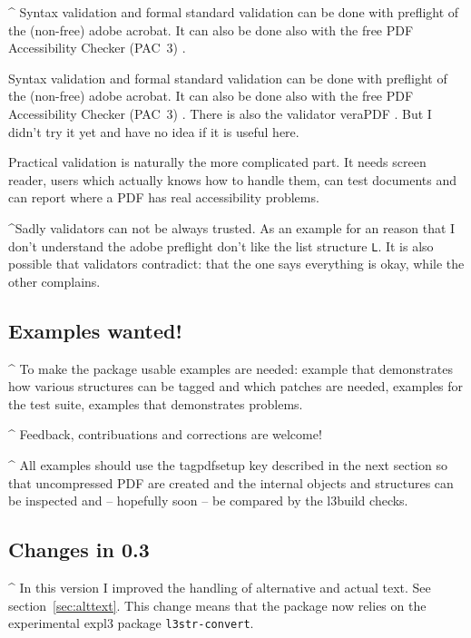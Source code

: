 \documentclass[DIV=12,parskip=half-,bibliography=totoc]{scrartcl}
\newcommand\PDF{PDF}
\begin{document}
\TagP^
Syntax validation and formal standard validation can be done with preflight of the (non-free) adobe acrobat.
It can also be done also with the free \PDF{} Accessibility Checker (PAC~3) \parencite{pac3}.

\TagP
Syntax validation and formal standard validation can be done with preflight of the (non-free) adobe acrobat.
It can also be done also with the free \PDF{} Accessibility Checker (PAC~3) \parencite{pac3}.
There is also the validator veraPDF \parencite{verapdf}. But I didn't try it yet and have no idea if it is useful here.

\TagP Practical validation is naturally the more complicated part. It needs screen reader, users which actually knows how to handle them, can test documents and can report where a \PDF{} has real accessibility problems.\TagPend




\TagP^Sadly validators can not be always trusted. As an example for an reason that I don't understand the adobe preflight don't like the list structure \texttt{L}.
It is also possible that validators contradict: that the one says everything is okay, while the other complains.\TagPend


\subsection{Examples wanted!}
\TagP^ To make the package usable examples are needed: example that demonstrates how various structures can be tagged and which patches are needed, examples for the test suite, examples that demonstrates problems.\TagPend

\begin{tcolorbox}[]
\TagP^ Feedback, contribuations and corrections are welcome!\TagPend
\end{tcolorbox}

\TagP^ All examples should use the tagpdfsetup key  described in the next section so that uncompressed \PDF{} are created and the internal objects and structures can be inspected and -- hopefully soon -- be compared by the l3build checks.%
\TagPend


\subsection{Changes in 0.3}

\TagP^
In this version I improved the handling of alternative and actual text. See section~\ref{sec:alttext}. This change means that the package now relies on the experimental expl3 package \texttt{l3str-convert}.
\end{document}
